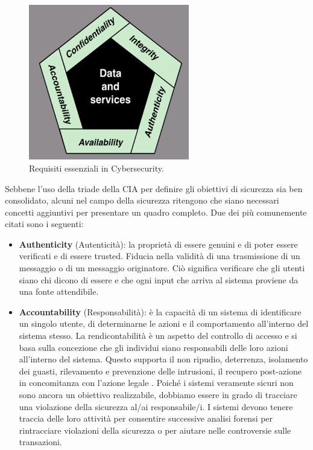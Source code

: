 \begin{figure}[H]
      \centering
      \includegraphics[width=7cm, keepaspectratio]{capitoli/cap_1/imgs/cia.png}
      \caption{Requisiti essenziali in Cybersecurity.}\label{fig:cia}
\end{figure}

Sebbene l'uso della triade della CIA per definire gli obiettivi di sicurezza sia ben consolidato,
alcuni nel campo della sicurezza ritengono che siano necessari concetti aggiuntivi per presentare
un quadro completo. Due dei più comunemente citati sono i seguenti:
\begin{itemize}
      \item \textbf{Authenticity} (Autenticità): la proprietà di essere genuini e di poter essere verificati e di essere trusted. Fiducia nella validità di una trasmissione di un messaggio o di un messaggio originatore. Ciò significa verificare che gli utenti siano chi dicono di essere e che ogni input che arriva al sistema proviene da una fonte attendibile.
      \item \textbf{Accountability} (Responsabilità): è la capacità di un sistema di identificare un singolo utente, di determinarne le azioni e il comportamento all'interno del sistema stesso. La rendicontabilità è un aspetto del controllo di accesso e si basa sulla concezione che gli individui siano responsabili delle loro azioni all'interno del sistema. Questo supporta il non ripudio, deterrenza, isolamento dei guasti, rilevamento e prevenzione delle intrusioni, il recupero post-azione in concomitanza con l'azione legale . Poiché i sistemi veramente sicuri non sono ancora un obiettivo realizzabile, dobbiamo essere in grado di tracciare una violazione della sicurezza al/ai responsabile/i. I sistemi devono tenere traccia delle loro attività per consentire successive analisi forensi per rintracciare violazioni della sicurezza o per aiutare nelle controversie sulle transazioni.
\end{itemize}

